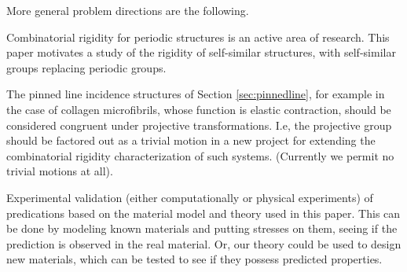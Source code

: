 More general problem directions are the following.
\begin{openproblem}
    Combinatorial rigidity for periodic structures is an active area of research. This paper motivates a study of the rigidity of self-similar structures, with self-similar groups replacing periodic groups.
\end{openproblem}

\begin{openproblem}
    The pinned line incidence structures of Section \ref{sec:pinnedline}, for example in the case of collagen microfibrils, whose function is elastic contraction, should be considered congruent under projective transformations. I.e, the projective group should be factored out as a trivial motion in a new project for extending the combinatorial rigidity characterization of such systems. (Currently we permit no trivial motions at all).
\end{openproblem}

\begin{openproblem}
    Experimental validation (either computationally or physical experiments) of predications based on the material model and theory used in this paper. This can be done by modeling known materials and putting stresses on them, seeing if the prediction is observed in the real material. Or, our theory could be used to design new materials, which can be tested to see if they possess predicted properties.
\end{openproblem}

